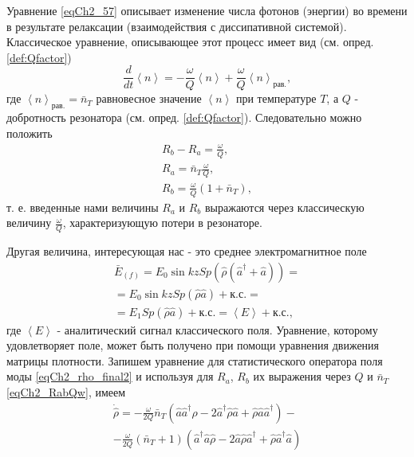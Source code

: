 Уравнение \eqref{eqCh2_57} описывает изменение числа фотонов (энергии)
во времени в результате релаксации (взаимодействия с диссипативной
системой). Классическое уравнение, описывающее этот процесс имеет вид
(см. опред. \ref{def:Qfactor})
\begin{equation}
\frac{d}{d t}\left<n\right> = 
- \frac{\omega}{Q}\left<n\right> + \frac{\omega}{Q} \left<n\right>_{\mbox{рав.}},
\nonumber
\end{equation}
где $\left<n\right>_{\mbox{рав.}} = \bar{n}_T$ равновесное значение
$\left<n\right>$ при температуре $T$, а $Q$ - добротность резонатора
(см. опред. \ref{def:Qfactor}).
Следовательно можно положить 
\begin{eqnarray}
R_b - R_a = \frac{\omega}{Q},
\nonumber \\
R_a = \bar{n}_T \frac{\omega}{Q},
\nonumber \\
R_b = \frac{\omega}{Q} \left(1 + \bar{n}_T\right),
\label{eqCh2_RabQw}
\end{eqnarray}
т. е. введенные нами величины $R_a$ и $R_b$ выражаются через
классическую величину $\frac{\omega}{Q}$, характеризующую потери в
резонаторе. 

Другая величина, интересующая нас - это среднее электромагнитное поле
\begin{eqnarray}
\bar{E}_{(f)} = E_0 \sin k z
Sp\left(\hat{\rho}\left(\hat{a}^{\dag} + \hat{a}\right)\right) = 
\nonumber \\
= E_0 \sin k z Sp\left(\hat{\rho}\hat{a}\right) + \mbox{к.с.} = 
\nonumber \\
= E_1 Sp\left(\hat{\rho}\hat{a}\right) + \mbox{к.с.} =
\left<E\right> + \mbox{к.с.}, 
\nonumber
\end{eqnarray}
где $\left<E\right>$ - аналитический сигнал классического
поля. 
Уравнение, которому удовлетворяет поле, может быть получено при
помощи уравнения движения матрицы плотности. Запишем уравнение для
статистического оператора поля моды  
\eqref{eqCh2_rho_final2} и
используя для $R_a$, $R_b$ их выражения через $Q$ и $\bar{n}_T$
  \eqref{eqCh2_RabQw}, имеем
\begin{eqnarray}
\dot{\hat{\rho}} =
- \frac{\omega}{2Q}\bar{n}_T
\left(\hat{a}\hat{a}^{\dag}\hat{\rho} - 
2 \hat{a}^{\dag}\hat{\rho}\hat{a} + \hat{\rho}\hat{a}\hat{a}^{\dag}
\right)
- 
\nonumber \\
- \frac{\omega}{2Q}\left(\bar{n}_T + 1\right)
\left(\hat{a}^{\dag}\hat{a}\hat{\rho} - 
2 \hat{a}\hat{\rho}\hat{a}^{\dag}
+ \hat{\rho}\hat{a}^{\dag}\hat{a}
\right)
\label{eqCh2_eq1_add1}
\end{eqnarray}


